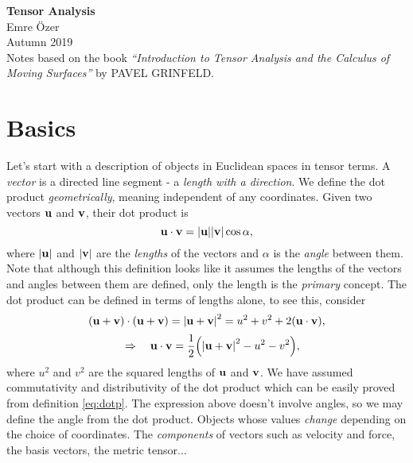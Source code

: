 \documentclass{article}
\begin{document}
	\begin{titlepage}
		\vspace*{\fill}
		\begin{center}
			{\Huge{\textbf{Tensor Analysis}}}\\[2cm]
			{\large{Emre Özer}\\[0.1cm]}
			Autumn 2019 \\
			\vspace{4mm}
			Notes based on the book \textit{``Introduction to Tensor Analysis and the Calculus of Moving Surfaces''} by PAVEL GRINFELD. 
		\end{center}
		\vspace*{\fill}
	\end{titlepage}
	
	\tableofcontents
	\newpage
	\section{Basics}
	Let's start with a description of objects in Euclidean spaces in tensor terms.
	 A \textit{vector} is a directed line segment - a \textit{length with a direction}.
	 We define the dot product \textit{geometrically}, meaning independent of any coordinates. Given two vectors $ \vb{u} $ and $ \vb{v} $, their dot product is
	\begin{equation} \label{eq:dotp}
		\vb{u} \cdot \vb{v} = \abs{\vb{u}} \abs{\vb{v}} \cos \alpha,
	\end{equation}
	where $ \abs{\vb{u}} $ and $ \abs{\vb{v}} $ are the \textit{lengths} of the vectors and $ \alpha $ is the \textit{angle} between them. Note that although this definition looks like it assumes the lengths of the vectors and angles between them are defined, only the length is the \textit{primary} concept. The dot product can be defined in terms of lengths alone, to see this, consider
	\[
	(\vb{u} + \vb{v}) \cdot (\vb{u} + \vb{v}) = \abs{\vb{u} + \vb{v}}^2 = u^2 + v^2 + 2 (\vb{u} \cdot \vb{v}),
	\]\[
	\quad \Rightarrow \quad \vb{u} \cdot \vb{v} = \frac{1}{2} \qty(\abs{\vb{u} + \vb{v}}^2 - u^2 - v^2),
	\]
	where $ u^2 $ and $ v^2 $ are the squared lengths of $ \vb{u} $ and $ \vb{v} $. We have assumed commutativity and distributivity of the dot product which can be easily proved from definition \eqref{eq:dotp}. The expression above doesn't involve angles, so we may define the angle from the dot product.
	 Objects whose values \textit{change} depending on the choice of coordinates.
	\example[Variants] The \textit{components} of vectors such as velocity and force, the basis vectors, the metric tensor...
\end{document}

